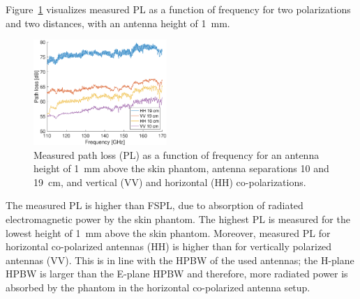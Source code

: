 \documentclass[preprint]{rsl}
\begin{document}
Figure~\ref{fig:PL_vs_freq} visualizes measured PL as a function of frequency for two polarizations and two distances, with an antenna height of 1~mm.
\begin{figure}[b!]
\begin{center}
  \includegraphics[width=0.45\textwidth]{figures/PL_vs_freq}
\caption{Measured path loss (PL) as a function of frequency for an antenna height of 1~mm above the skin phantom, antenna separations 10 and 19~cm, and vertical (VV) and horizontal (HH) co-polarizations.}
\label{fig:PL_vs_freq}
\end{center}
\end{figure}
The measured PL is higher than FSPL, due to absorption of radiated electromagnetic power by the skin phantom.
The highest PL is measured for the lowest height of 1~mm above the skin phantom.
Moreover, measured PL for horizontal co-polarized antennas (HH) is higher than for vertically polarized antennas (VV).
This is in line with the HPBW of the used antennas; the H-plane HPBW is larger than the E-plane HPBW and therefore, more radiated power is absorbed by the phantom in the horizontal co-polarized antenna setup.
\end{document}
